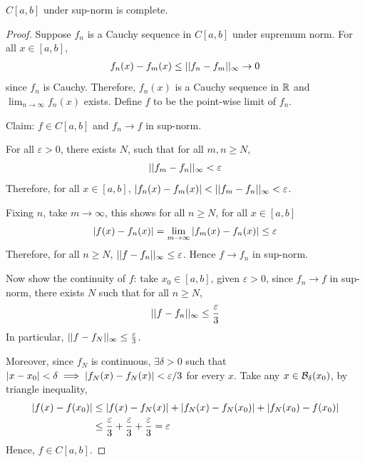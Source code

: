 \documentclass[11pt]{article}
\begin{document}
	\begin{proposition}
		$C[a, b]$ under sup-norm is complete.
		\begin{proof}
			Suppose $f_n$ is a Cauchy sequence in $C[a, b]$ under supremum norm. For all $x \in [a, b]$,
			\begin{align}
				f_n(x) - f_m(x) \leq \vert \vert {f_n - f_m} \vert \vert_\infty \to 0
			\end{align}
			since $f_n$ is Cauchy. Therefore, $f_n(x)$ is a Cauchy sequence in $\mathbb{R}$ and $\lim_{n\to\infty} f_n(x)$ exists. Define $f$ to be the point-wise limit of $f_n$.
			
			Claim: $f \in C[a, b]$ and $f_n \to f$ in sup-norm.
			
			For all $\varepsilon > 0$, there exists $N$, such that for all $m, n \geq N$,
			\begin{align}
				\vert \vert {f_m - f_n} \vert \vert_\infty < \varepsilon
			\end{align}
			Therefore, for all $x \in [a, b]$, $\left \vert {f_n(x) - f_m(x)} \right \vert < \vert \vert {f_m - f_n} \vert \vert_\infty < \varepsilon$.
			
			Fixing $n$, take $m \to \infty$, this shows for all $n \geq N$, for all $x \in [a, b]$
			\begin{align}
				\left \vert {f(x) - f_n(x)} \right \vert = \lim_{m\to\infty} \left \vert {f_m(x) - f_n(x)} \right \vert \leq \varepsilon
			\end{align}
			Therefore, for all $n \geq N$, $\vert \vert {f - f_n} \vert \vert_\infty \leq \varepsilon$. Hence $f \to f_n$ in sup-norm.
			
			Now show the continuity of $f$: take $x_0 \in [a, b]$, given $\varepsilon > 0$, since $f_n \to f$ in sup-norm, there exists $N$ such that for all $n \geq N$,
			\begin{align}
				\vert \vert {f - f_n} \vert \vert_\infty \leq \frac{\varepsilon}{3}
			\end{align}
			In particular, $\vert \vert {f - f_N} \vert \vert_\infty \leq \frac{\varepsilon}{3}$.
			
			Moreover, since $f_N$ is continuous, $\exists \delta > 0$ such that $\left \vert {x - x_0} \right \vert < \delta \implies \left \vert {f_N(x) - f_N(x)} \right \vert < \varepsilon / 3$ for every $x$. Take any $x \in \mathcal{{B}}_\delta(x_0)$, by triangle inequality,
			\begin{align}
				\left \vert {f(x) - f(x_0)} \right \vert &\leq \left \vert {f(x) - f_N(x)} \right \vert + \left \vert {f_N(x) - f_N(x_0)} \right \vert + \left \vert {f_N(x_0) - f(x_0)} \right \vert \\
				&\leq \frac{\varepsilon}{3} + \frac{\varepsilon}{3} + \frac{\varepsilon}{3} = \varepsilon
			\end{align}
			Hence, $f \in C[a, b]$. 
		\end{proof}
	\end{proposition}
	
\end{document}

